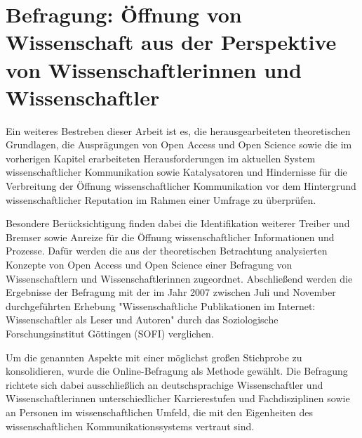 \chapter{Befragung: Öffnung von Wissenschaft aus der Perspektive von Wissenschaftlerinnen und Wissenschaftler}

Ein weiteres Bestreben dieser Arbeit ist es, die herausgearbeiteten theoretischen Grundlagen, die Ausprägungen von Open Access und Open Science sowie die im vorherigen Kapitel erarbeiteten Herausforderungen im aktuellen System wissenschaftlicher Kommunikation sowie Katalysatoren und Hindernisse für die Verbreitung der Öffnung wissenschaftlicher Kommunikation vor dem Hintergrund wissenschaftlicher Reputation im Rahmen einer Umfrage zu überprüfen.

Besondere Berücksichtigung finden dabei die Identifikation weiterer Treiber und Bremser sowie Anreize für die Öffnung wissenschaftlicher Informationen und Prozesse. Dafür werden die aus der theoretischen Betrachtung analysierten Konzepte von Open Access und Open Science einer Befragung von Wissenschaftlern und Wissenschaftlerinnen zugeordnet. Abschließend werden die Ergebnisse der Befragung mit der im Jahr 2007 zwischen Juli und November durchgeführten Erhebung "Wissenschaftliche Publikationen im Internet: Wissenschaftler als Leser und Autoren" durch das Soziologische Forschungsinstitut Göttingen (SOFI) \cite{Hanekop_2008} verglichen.

Um die genannten Aspekte mit einer möglichst großen Stichprobe zu konsolidieren, wurde die Online-Befragung als Methode gewählt. Die Befragung richtete sich dabei ausschließlich an deutschsprachige Wissenschaftler und Wissenschaftlerinnen unterschiedlicher Karrierestufen und Fachdisziplinen sowie an Personen im wissenschaftlichen Umfeld, die mit den Eigenheiten des wissenschaftlichen Kommunikationssystems vertraut sind.

